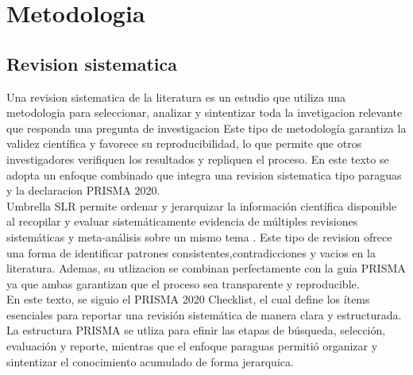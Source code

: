 \chapter{Metodologia}
\section{Revision sistematica}
Una revision sistematica de la literatura es un estudio 
que utiliza una metodologia para seleccionar, analizar y 
sintentizar toda la invetigacion relevante que responda una pregunta de investigacion 
Este tipo de metodología garantiza la validez científica y favorece su reproducibilidad, lo que permite que otros investigadores verifiquen los resultados 
y repliquen el proceso. En este texto se adopta un enfoque combinado que integra una revision sistematica
tipo paraguas y la declaracion PRISMA 2020.\\
Umbrella SLR permite ordenar y jerarquizar la información científica disponible al recopilar y evaluar sistemáticamente evidencia de múltiples revisiones sistemáticas y 
meta-análisis sobre un mismo tema \cite{Papatheodorou2019}. Este tipo de revision ofrece una forma de identificar patrones consistentes,contradicciones y vacios en la literatura. 
Ademas, su utlizacion se combinan perfectamente con la guia PRISMA ya que ambas garantizan que el proceso sea transparente y reproducible.\\
En este texto, se siguio el PRISMA 2020 Checklist, el cual define los ítems esenciales para reportar una revisión sistemática de manera clara y estructurada.
La estructura PRISMA se utliza para efinir las etapas de búsqueda, selección, evaluación y reporte, mientras que el enfoque paraguas permitió organizar y sintentizar el conocimiento acumulado de forma jerarquica.
